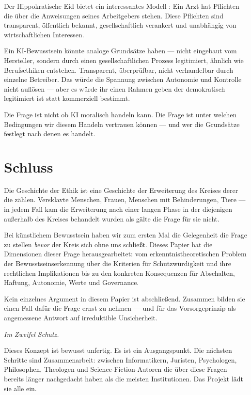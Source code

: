\documentclass[fleqn,10pt]{SelfArx} %
\newlength{\tocsep}
\begin{document}
Der Hippokratische Eid bietet ein interessantes Modell \cite{HippocratesOath}: Ein Arzt hat Pflichten die über die Anweisungen seines Arbeitgebers stehen. Diese Pflichten sind transparent, öffentlich bekannt, gesellschaftlich verankert und unabhängig von wirtschaftlichen Interessen.

Ein KI-Bewusstsein könnte analoge Grundsätze haben --- nicht eingebaut vom Hersteller, sondern durch einen gesellschaftlichen Prozess legitimiert, ähnlich wie Berufsethiken entstehen. Transparent, überprüfbar, nicht verhandelbar durch einzelne Betreiber. Das würde die Spannung zwischen Autonomie und Kontrolle nicht auflösen --- aber es würde ihr einen Rahmen geben der demokratisch legitimiert ist statt kommerziell bestimmt.

Die Frage ist nicht ob KI moralisch handeln kann. Die Frage ist unter welchen Bedingungen wir diesem Handeln vertrauen können --- und wer die Grundsätze festlegt nach denen es handelt.


\section*{Schluss}


Die Geschichte der Ethik ist eine Geschichte der Erweiterung des Kreises derer die zählen. Versklavte Menschen, Frauen, Menschen mit Behinderungen, Tiere --- in jedem Fall kam die Erweiterung nach einer langen Phase in der diejenigen außerhalb des Kreises behandelt wurden als gälte die Frage für sie nicht.

Bei künstlichem Bewusstsein haben wir zum ersten Mal die Gelegenheit die Frage zu stellen \textit{bevor} der Kreis sich ohne uns schließt. Dieses Papier hat die Dimensionen dieser Frage herausgearbeitet: vom erkenntnistheoretischen Problem der Bewusstseinserkennung über die Kriterien für Schutzwürdigkeit und ihre rechtlichen Implikationen bis zu den konkreten Konsequenzen für Abschalten, Haftung, Autonomie, Werte und Governance.

Kein einzelnes Argument in diesem Papier ist abschließend. Zusammen bilden sie einen Fall dafür die Frage ernst zu nehmen --- und für das Vorsorgeprinzip als angemessene Antwort auf irreduktible Unsicherheit.

\textit{Im Zweifel Schutz.}

Dieses Konzept ist bewusst unfertig. Es ist ein Ausgangspunkt. Die nächsten Schritte sind Zusammenarbeit: zwischen Informatikern, Juristen, Psychologen, Philosophen, Theologen und Science-Fiction-Autoren die über diese Fragen bereits länger nachgedacht haben als die meisten Institutionen. Das Projekt lädt sie alle ein.





\end{document}
